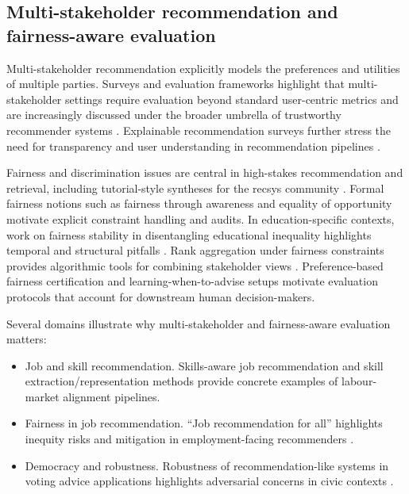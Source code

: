 \subsection{Multi-stakeholder recommendation and fairness-aware evaluation}
\label{sec:rw-ms}

Multi-stakeholder recommendation explicitly models the preferences and utilities of multiple parties.
Surveys and evaluation frameworks highlight that multi-stakeholder settings require evaluation beyond standard user-centric metrics \cite{abdollahpouri2020multistakeholder,burke2025mseval} and are increasingly discussed under the broader umbrella of trustworthy recommender systems \cite{ge2024trustworthyRS}.
Explainable recommendation surveys further stress the need for transparency and user understanding in recommendation pipelines \cite{zhang2020explainableRS}.

Fairness and discrimination issues are central in high-stakes recommendation and retrieval, including tutorial-style syntheses for the recsys community \cite{ekstrand2019fairness}.
Formal fairness notions such as fairness through awareness \cite{dwork2012fairness} and equality of opportunity \cite{hardt2016equality} motivate explicit constraint handling and audits.
In education-specific contexts, work on fairness stability in disentangling educational inequality highlights temporal and structural pitfalls \cite{fairdas2024}.
Rank aggregation under fairness constraints provides algorithmic tools for combining stakeholder views \cite{fairRankAgg2025}.
Preference-based fairness certification \cite{prefFairCert2023} and learning-when-to-advise setups \cite{advise2023} motivate evaluation protocols that account for downstream human decision-makers.

Several domains illustrate why multi-stakeholder and fairness-aware evaluation matters:
\begin{itemize}
    \item {Job and skill recommendation.} Skills-aware job recommendation and skill extraction/representation methods \cite{giabelli2021skills2job,kara2022skillEmbeddings,leon2024transversalSkills} provide concrete examples of labour-market alignment pipelines.
    \item {Fairness in job recommendation.} ``Job recommendation for all'' highlights inequity risks and mitigation in employment-facing recommenders \cite{bied2023jobrecforall}.
    \item {Democracy and robustness.} Robustness of recommendation-like systems in voting advice applications highlights adversarial concerns in civic contexts \cite{berdoz2025democracy}.
\end{itemize}

